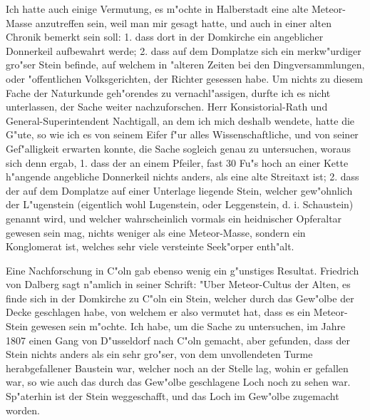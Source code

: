 \documentclass[a4paper, 11pt, oneside, polutonikogreek, german]{article}
\begin{document}
Ich hatte auch einige Vermutung, es m"ochte in Halberstadt eine alte Meteor-Masse anzutreffen sein, weil man mir gesagt hatte, und auch in einer alten Chronik bemerkt sein soll: 1. dass dort in der Domkirche ein angeblicher Donnerkeil aufbewahrt werde; 2. dass auf dem Domplatze sich ein merkw"urdiger gro"ser Stein befinde, auf welchem in "alteren Zeiten bei den Dingversammlungen, oder "offentlichen Volksgerichten, der Richter gesessen habe. Um nichts zu diesem Fache der Naturkunde geh"orendes zu vernachl"assigen, durfte ich es nicht unterlassen, der Sache weiter nachzuforschen. Herr Konsistorial-Rath und General-Superintendent Nachtigall, an dem ich mich deshalb wendete, hatte die G"ute, so wie ich es von seinem Eifer f"ur alles Wissenschaftliche, und von seiner Gef"alligkeit erwarten konnte, die Sache sogleich genau zu untersuchen, woraus sich denn ergab, 1. dass der an einem Pfeiler, fast 30 Fu"s hoch an einer Kette h"angende angebliche Donnerkeil nichts anders, als eine alte Streitaxt ist; 2. dass der auf dem Domplatze auf einer Unterlage liegende Stein, welcher gew"ohnlich der L"ugenstein (eigentlich wohl Lugenstein, oder Leggenstein, d. i. Schaustein) genannt wird, und welcher wahrscheinlich vormals ein heidnischer Opferaltar gewesen sein mag, nichts weniger als eine Meteor-Masse, sondern ein Konglomerat ist, welches sehr viele versteinte Seek"orper enth"alt.

Eine Nachforschung in C"oln gab ebenso wenig ein g"unstiges Resultat. Friedrich von Dalberg sagt n"amlich in seiner Schrift: "Uber Meteor-Cultus der Alten, es finde sich in der Domkirche zu C"oln ein Stein, welcher durch das Gew"olbe der Decke geschlagen habe, von welchem er also vermutet hat, dass es ein Meteor-Stein gewesen sein m"ochte. Ich habe, um die Sache zu untersuchen, im Jahre 1807 einen Gang von D"usseldorf nach C"oln gemacht, aber gefunden, dass der Stein nichts anders als ein sehr gro"ser, von dem unvollendeten Turme herabgefallener Baustein war, welcher noch an der Stelle lag, wohin er gefallen war, so wie auch das durch das Gew"olbe geschlagene Loch noch zu sehen war. Sp"aterhin ist der Stein weggeschafft, und das Loch im Gew"olbe zugemacht worden.
\subsection{}
\end{document}
